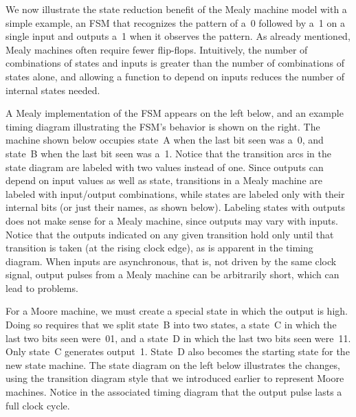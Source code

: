 We now illustrate the state reduction benefit of the Mealy machine
model with a simple example, an FSM that recognizes the 
pattern of a~0 followed by a~1 on a single input and outputs
a~1 when it observes the pattern.
%
As already mentioned,
Mealy machines often require fewer flip-flops.
Intuitively, the number of combinations of states and
inputs is greater than the number of combinations of states alone, and
allowing a function to depend on inputs reduces the number of internal
states needed.  

A Mealy implementation of the FSM appears on the left below, and
an example timing diagram illustrating the FSM's behavior is shown on
the right.
%
The machine shown below occupies state~A when the last bit seen was a~0, and
state~B when the last bit seen was a~1.
%
Notice that the transition arcs in the state diagram
are labeled with two values instead
of one.  Since outputs can depend on input values as well as state,
transitions in a Mealy machine are labeled with input/output
combinations, while states are labeled only with their internal bits
(or just their names, as shown below).  Labeling states with outputs
does not make sense for a Mealy machine, since outputs may vary
with inputs.
%
Notice that the outputs indicated on any given transition
hold only until that transition is taken (at the rising clock edge), as is
apparent in the timing diagram.  When inputs are asynchronous, 
that is,
not driven by the same clock signal, output pulses from a Mealy
machine can be arbitrarily short, which can lead to problems.\\

\vfill

\centerline{}

\vfill

For a Moore machine, we must create a special state in which the
output is high.  Doing so requires that we split state~B into two
states, a state~C in which the last two bits seen were~01, and a
state~D in which the last two bits seen were~11.  Only state~C
generates output~1.  State~D also becomes the starting state for the
new state machine.  The state diagram on the left below illustrates 
the changes, using the transition diagram style that we introduced 
earlier to represent Moore machines.
Notice in the associated timing diagram that the output pulse lasts a
full clock cycle.\\

\vfill

\centerline{}

\vfill

\pagebreak

